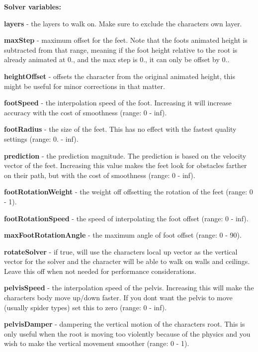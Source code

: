 {\bfseries Solver variables\+:}
\begin{DoxyItemize}
\item {\bfseries layers} -\/ the layers to walk on. Make sure to exclude the character\textquotesingle{}s own layer.
\item {\bfseries max\+Step} -\/ maximum offset for the feet. Note that the foot\textquotesingle{}s animated height is subtracted from that range, meaning if the foot height relative to the root is already animated at 0., and the max step is 0., it can only be offset by 0..
\item {\bfseries height\+Offset} -\/ offsets the character from the original animated height, this might be useful for minor corrections in that matter.
\item {\bfseries foot\+Speed} -\/ the interpolation speed of the foot. Increasing it will increase accuracy with the cost of smoothness (range\+: 0 -\/ inf).
\item {\bfseries foot\+Radius} -\/ the size of the feet. This has no effect with the fastest quality settings (range\+: 0. -\/ inf).
\item {\bfseries prediction} -\/ the prediction magnitude. The prediction is based on the velocity vector of the feet. Increasing this value makes the feet look for obstacles farther on their path, but with the cost of smoothness (range\+: 0 -\/ inf).
\item {\bfseries foot\+Rotation\+Weight} -\/ the weight off offsetting the rotation of the feet (range\+: 0 -\/ 1).
\item {\bfseries foot\+Rotation\+Speed} -\/ the speed of interpolating the foot offset (range\+: 0 -\/ inf).
\item {\bfseries max\+Foot\+Rotation\+Angle} -\/ the maximum angle of foot offset (range\+: 0 -\/ 90).
\item {\bfseries rotate\+Solver} -\/ if true, will use the character\textquotesingle{}s local up vector as the vertical vector for the solver and the character will be able to walk on walls and ceilings. Leave this off when not needed for performance considerations.
\item {\bfseries pelvis\+Speed} -\/ the interpolation speed of the pelvis. Increasing this will make the character\textquotesingle{}s body move up/down faster. If you don\textquotesingle{}t want the pelvis to move (usually spider types) set this to zero (range\+: 0 -\/ inf).
\item {\bfseries pelvis\+Damper} -\/ dampering the vertical motion of the character\textquotesingle{}s root. This is only useful when the root is moving too violently because of the physics and you wish to make the vertical movement smoother (range\+: 0 -\/ 1).

\end{DoxyItemize}
